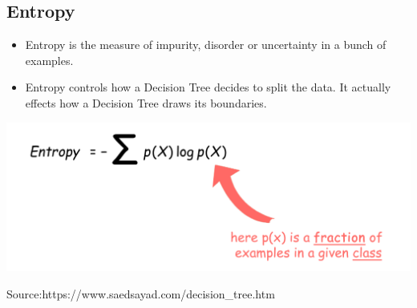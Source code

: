 \documentclass[a0,portrait]{a0poster}
\begin{document}
\begin{multicols}{3}
\subsection*{Entropy}
\begin{itemize}
\item Entropy is the measure of impurity, disorder or uncertainty in a bunch of examples.
\item Entropy controls how a Decision Tree decides to split the data. It actually effects how a Decision Tree draws its boundaries.
\end{itemize}
\begin{center}\vspace{1cm}
\includegraphics[width=1.0\linewidth]{entropy.png}
\caption*{Source:https://www.saedsayad.com/decision_tree.htm}
\end{center}\vspace{1cm}



\end{multicols}
\end{document}
